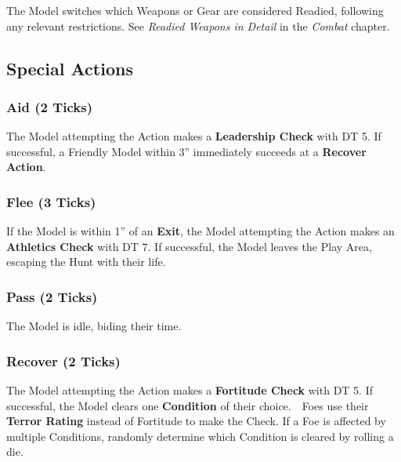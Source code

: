 \documentclass[
]{book}
\begin{document}
The Model switches which Weapons or Gear are considered Readied, following any relevant restrictions. See \emph{Readied Weapons in Detail} in the \emph{Combat} chapter.

\hypertarget{special-actions}{%
\subsection{Special Actions}\label{special-actions}}

\hypertarget{aid-2-ticks}{%
\subsubsection*{Aid (2 Ticks)}\label{aid-2-ticks}}

The Model attempting the Action makes a \textbf{Leadership Check} with DT 5. If successful, a Friendly Model within 3'' immediately succeeds at a \textbf{Recover Action}.

\hypertarget{flee-3-ticks}{%
\subsubsection*{Flee (3 Ticks)}\label{flee-3-ticks}}

If the Model is within 1'' of an \textbf{Exit}, the Model attempting the Action makes an \textbf{Athletics Check} with DT 7. If successful, the Model leaves the Play Area, escaping the Hunt with their life.

\hypertarget{pass-2-ticks}{%
\subsubsection*{Pass (2 Ticks)}\label{pass-2-ticks}}

The Model is idle, biding their time.

\hypertarget{recover-2-ticks}{%
\subsubsection*{Recover (2 Ticks)}\label{recover-2-ticks}}

The Model attempting the Action makes a \textbf{Fortitude Check} with DT 5. If successful, the Model clears one \textbf{Condition} of their choice.  
Foes use their \textbf{Terror Rating} instead of Fortitude to make the Check. If a Foe is affected by multiple Conditions, randomly determine which Condition is cleared by rolling a die.
\end{document}
